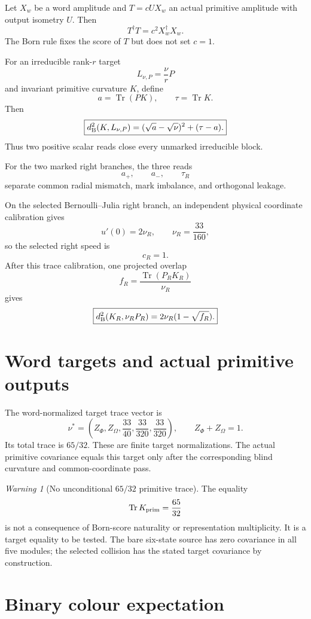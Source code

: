 \documentclass[11pt,oneside,openany]{book}
\numberwithin{equation}{chapter}
\theoremstyle{definition}
\theoremstyle{remark}
\newtheorem{warning}[theorem]{Warning}
\newcommand{\Tr}{\operatorname{Tr}}
\begin{document}
Let \(X_w\) be a word amplitude and \(T=cUX_w\) an actual primitive amplitude
with output isometry \(U\).  Then
\[
 T^\dagger T=c^2X_w^\dagger X_w.
\]
The Born rule fixes the score of \(T\) but does not set \(c=1\).

For an irreducible rank-\(r\) target
\[
 L_{\nu,P}=\frac{\nu}{r}P
\]
and invariant primitive curvature \(K\), define
\[
 a=\Tr(PK),
 \qquad
 \tau=\Tr K.
\]
Then
\[
 \boxed{
 d_{\rm B}^2(K,L_{\nu,P})
 =
 (\sqrt a-\sqrt\nu)^2+(\tau-a).}
 \label{eq:two-read-Bures}
\]
Thus two positive scalar reads close every unmarked irreducible block.

For the two marked right branches, the three reads
\[
 a_+,\qquad a_-,\qquad\tau_R
\]
separate common radial mismatch, mark imbalance, and orthogonal leakage.

On the selected Bernoulli--Julia right branch, an independent physical
coordinate calibration gives
\[
 u'(0)=2\nu_R,
 \qquad
 \nu_R=\frac{33}{160},
\]
so the selected right speed is
\[
 \boxed{c_R=1.}
\]
After this trace calibration, one projected overlap
\[
 f_R=\frac{\Tr(P_RK_R)}{\nu_R}
\]
gives
\[
 \boxed{
 d_{\rm B}^2(K_R,\nu_RP_R)
 =
 2\nu_R(1-\sqrt{f_R}).}
\]

\section{Word targets and actual primitive outputs}

The word-normalized target trace vector is
\[
 \boxed{
 \nu^*
 =
 \left(
 Z_\Phi,Z_\Omega,
 \frac{33}{40},
 \frac{33}{320},
 \frac{33}{320}
 \right),
 \qquad
 Z_\Phi+Z_\Omega=1.}
\]
Its total trace is \(65/32\).  These are finite target normalizations.  The
actual primitive covariance equals this target only after the corresponding
blind curvature and common-coordinate pass.

\begin{warning}[No unconditional \(65/32\) primitive trace]
The equality
\[
 \Tr K_{\rm prim}=\frac{65}{32}
\]
is not a consequence of Born-score naturality or representation
multiplicity.  It is a target equality to be tested.  The bare six-state
source has zero covariance in all five modules; the selected collision has
the stated target covariance by construction.
\end{warning}

\section{Binary colour expectation}
\end{document}
